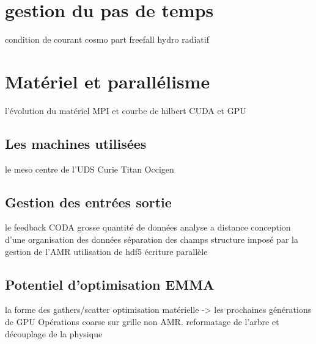 \section{gestion du pas de temps}

condition de courant
cosmo
part
freefall
hydro
radiatif

\section{Matériel et parallélisme}

l'évolution du matériel
MPI et courbe de hilbert
CUDA et GPU

\subsection{Les machines utilisées}

le meso centre de l'UDS
Curie
Titan
Occigen

\subsection{Gestion des entrées sortie}

le feedback CODA
grosse quantité de données
analyse a distance
conception d'une organisation des données
séparation des champs
structure imposé par la gestion de l'AMR
utilisation de hdf5
écriture parallèle

\subsection{Potentiel d'optimisation EMMA}

la forme des gathers/scatter
optimisation matérielle -> les prochaines générations de GPU
Opérations coarse sur grille non AMR.
reformatage de l'arbre et découplage de la physique
